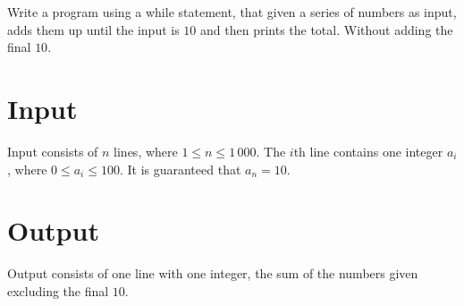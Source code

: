 
Write a program using a while statement, that given a series of numbers as input, adds them up until the input is $10$ and then prints the total.
Without adding the final $10$.

\section*{Input}

Input consists of $n$ lines, where $1 \leq n \leq 1\,000$.
The $i$th line contains one integer $a_i$, where  $0 \leq a_i \leq 100$.
It is guaranteed that $a_n = 10$.

\section*{Output}

Output consists of one line with one integer, the sum of the numbers given excluding the final $10$.
